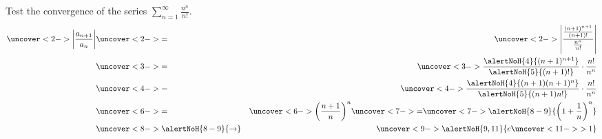 \begin{frame}
\begin{example} %
Test the convergence of the series $\displaystyle \sum_{n=1}^\infty \frac{n^n}{n!}$.
\abovedisplayskip=0pt
\belowdisplayskip=0pt
\begin{eqnarray*}
\uncover<2->{%
\left| \frac{a_{n+1}}{a_n}\right| %
}%
 & \uncover<2->{=} & %
\uncover<2->{%
\left| \frac{\frac{(n+1)^{n+1}}{(n+1)!}}{\frac{n^n}{n!}}\right| %
}\\%
 & \uncover<3->{=} & %
\uncover<3->{%
\frac{\alertNoH{ 4}{(n+1)^{n+1}}}{\alertNoH{ 5}{(n+1)!}}\cdot \frac{n!}{n^n}%
}\\%
 & \uncover<4->{=} & %
\uncover<4->{%
\frac{\alertNoH{ 4}{(n+1)(n+1)^{n}}}{\alertNoH{ 5}{(n+1)n!}}\cdot \frac{n!}{n^n}%
}\\%
 & \uncover<6->{=} & %
\uncover<6->{%
\left( \frac{n+1}{n}\right)^n%
}%
  \uncover<7->{=}  %
\uncover<7->{%
\alertNoH{ 8-9}{%
\left( 1 + \frac{1}{n}\right)^n%
}%
}\\%
 & \uncover<8->{\alertNoH{ 8-9}{\to}} & %
\uncover<9->{%
\alertNoH{ 9,11}{%
e \uncover<11->{ > 1 }
}%
}%
\end{eqnarray*}
%
\end{example}
\end{frame}
